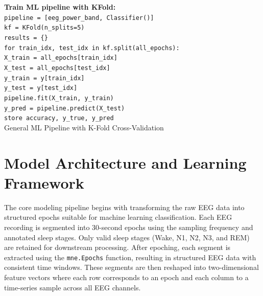 \begin{algorithm}
		\vspace{0.3cm}
		\textbf{Train ML pipeline with KFold:} \\
		\texttt{pipeline = [eeg\_power\_band, Classifier()]} \\
		\texttt{kf = KFold(n\_splits=5)} \\
		\texttt{results = \{\}} \\
		\texttt{for train\_idx, test\_idx in kf.split(all\_epochs):} \\
		\hspace*{0.5cm}\texttt{X\_train = all\_epochs[train\_idx]} \\
		\hspace*{0.5cm}\texttt{X\_test = all\_epochs[test\_idx]} \\
		\hspace*{0.5cm}\texttt{y\_train = y[train\_idx]} \\
		\hspace*{0.5cm}\texttt{y\_test = y[test\_idx]} \\
		\hspace*{0.5cm}\texttt{pipeline.fit(X\_train, y\_train)} \\
		\hspace*{0.5cm}\texttt{y\_pred = pipeline.predict(X\_test)} \\
		\hspace*{0.5cm}\texttt{store accuracy, y\_true, y\_pred} \\
		
	 
		
		\caption{General ML Pipeline with K-Fold Cross-Validation}
	\end{algorithm}
	
	
	
	
	
	
 
 
 
 
 
 
 
 
 
 
 
 
  



\section{Model Architecture and Learning Framework}


The core modeling pipeline begins with transforming the raw EEG data into structured epochs suitable for machine learning classification. Each EEG recording is segmented into 30-second epochs using the sampling frequency and annotated sleep stages. Only valid sleep stages (Wake, N1, N2, N3, and REM) are retained for downstream processing. After epoching, each segment is extracted using the \texttt{mne.Epochs} function, resulting in structured EEG data with consistent time windows. These segments are then reshaped into two-dimensional feature vectors where each row corresponds to an epoch and each column to a time-series sample across all EEG channels.

